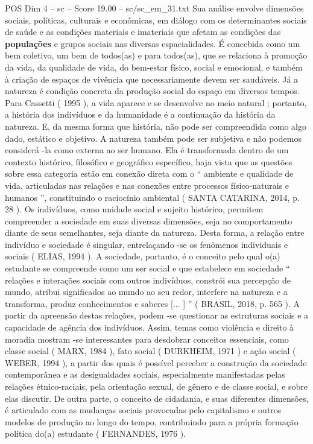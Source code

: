 \begin{textsample}{POS Dim 4 – sc – Score 19.00 – sc/sc\_em\_31.txt}
Sua análise envolve dimensões sociais, políticas, culturais e econômicas, em diálogo com os determinantes sociais de saúde e as condições materiais e imateriais que afetam as condições das \textbf{populações} e grupos sociais nas diversas espacialidades.
É concebida como um bem coletivo, um bem de todos(as) e para todos(as), que se relaciona à promoção da vida, da qualidade de vida, do bem-estar físico, social e emocional, e também à criação de espaços de vivência que necessariamente devem ser saudáveis.
Já a natureza é condição concreta da produção social do espaço em diversos tempos.
Para Cassetti ( 1995 ), a vida aparece e se desenvolve no meio natural ; portanto, a história dos indivíduos e da humanidade é a continuação da história da natureza.
E, da mesma forma que história, não pode ser compreendida como algo dado, estático e objetivo.
A natureza também pode ser subjetiva e não podemos considerá -la como externa ao ser humano.
Ela é transformada dentro de um contexto histórico, filosófico e geográfico específico, haja vista que as questões sobre essa categoria estão em conexão direta com o “ ambiente e qualidade de vida, articuladas nas relações e nas conexões entre processos físico-naturais e humanos ”, constituindo o raciocínio ambiental ( SANTA CATARINA, 2014, p. 28 ).
Os indivíduos, como unidade social e sujeito histórico, permitem compreender a sociedade em suas diversas dimensões, seja no comportamento diante de seus semelhantes, seja diante da natureza.
Desta forma, a relação entre indivíduo e sociedade é singular, entrelaçando -se os fenômenos individuais e sociais ( ELIAS, 1994 ).
A sociedade, portanto, é o conceito pelo qual o(a) estudante se compreende como um ser social e que estabelece em sociedade “ relações e interações sociais com outros indivíduos, constrói sua percepção de mundo, atribui significados ao mundo ao seu redor, interfere na natureza e a transforma, produz conhecimentos e saberes [... ] ” ( BRASIL, 2018, p. 565 ).
A partir da apreensão destas relações, podem -se questionar as estruturas sociais e a capacidade de agência dos indivíduos.
Assim, temas como violência e direito à moradia mostram -se interessantes para desdobrar conceitos essenciais, como classe social ( MARX, 1984 ), fato social ( DURKHEIM, 1971 ) e ação social ( WEBER, 1994 ), a partir dos quais é possível perceber a construção da sociedade contemporânea e as desigualdades sociais, especialmente manifestadas pelas relações étnico-raciais, pela orientação sexual, de gênero e de classe social, e sobre elas discutir.
De outra parte, o conceito de cidadania, e suas diferentes dimensões, é articulado com as mudanças sociais provocadas pelo capitalismo e outros modelos de produção ao longo do tempo, contribuindo para a própria formação política do(a) estudante ( FERNANDES, 1976 ).

\end{textsample}

